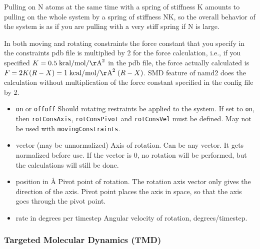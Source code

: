 Pulling on N atoms at the same time with a spring of stiffness K
   amounts to pulling on the whole system by a spring of stiffness NK,
   so the overall behavior of the system is as if you are pulling with a
   very stiff spring if N is large.

In both moving and rotating constraints the force constant that you
   specify in the constraints pdb file is multiplied by 2 for the force
   calculation, i.e., if you specified $K = 0.5 \; {\rm kcal}/{\rm mol}/{\rm \AA}^2$ in the pdb
file,
   the force actually calculated is $F = 2 K (R-X) = 1 \; {\rm kcal}/{\rm mol}/{\rm \AA}^2 \; (R-X)$.
   SMD feature of namd2 does the calculation without multiplication of
the
   force constant specified in the config file by 2.


\begin{itemize}

\item
{}
{{\tt on} or {\tt off}}{{\tt off}}
{Should rotating restraints be applied to the system. If set
to {\tt on}, then {\tt rotConsAxis}, {\tt rotConsPivot} and
{\tt rotConsVel} must be defined.
May not be used with {\tt movingConstraints}.}

\item
{}
{vector (may be unnormalized)}
{Axis of rotation. Can be any vector. It gets
normalized before use. If the vector is 0,
no rotation will be performed, but the calculations
will still be done.}

\item
{}
{position in \AA}
{Pivot point of rotation. The rotation axis vector
only gives the direction of the axis. Pivot point
places the axis in space, so that the axis goes
through the pivot point.}

\item
{}
{rate in degrees per timestep}
{Angular velocity of rotation, degrees/timestep.}

\end{itemize}

\subsubsection{Targeted Molecular Dynamics (TMD)}

